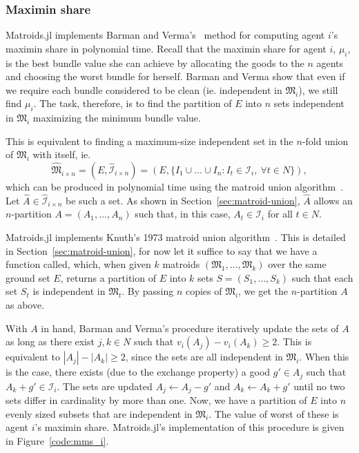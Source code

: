 \subsubsection*{Maximin share}
Matroids.jl implements Barman and Verma's~\cite[Appendix A]{barman2021existence} method for computing agent $i$'s maximin share in polynomial time. Recall that the maximin share for agent $i$,  $\mu_i$, is the best bundle value she can achieve by allocating the goods to the $n$ agents and choosing the worst bundle for herself. Barman and Verma show that even if we require each bundle considered to be clean (ie. independent in $\mathfrak{M}_i$), we still find $\mu_i$. The task, therefore, is to find the partition of $E$ into $n$ sets independent in $\mathfrak{M}_i$ maximizing the minimum bundle value.

This is equivalent to finding a maximum-size independent set in the $n$-fold union of $\mathfrak{M}_i$ with itself, ie.
$$\widehat{\mathfrak{M}}_{i \times n} = (E, \widehat{\mathcal{I}}_{i\times n}) = (E, \{ I_1\cup\dots\cup I_n : I_t \in \mathcal{I}_i,\ \forall t \in N \}),$$ 
which can be produced in polynomial time using the matroid union algorithm~\cite[Ch. 42]{schrijver-2003}. Let $\widehat{A}\in\widehat{\mathcal{I}}_{i\times n}$ be such a set. As shown in Section~\ref{sec:matroid-union}, $\widehat{A}$ allows an $n$-partition $A = (A_1,\dots,A_n)$ such that, in this case, $A_t\in\mathcal{I}_i$ for all $t\in N$.



Matroids.jl implements Knuth's 1973 matroid union algorithm~\cite{knuth1973matroidpartitioning}. This is detailed in Section~\ref{sec:matroid-union}, for now let it suffice to say that we have a function called\linebreak{}, which, when given $k$ matroids $(\mathfrak{M}_1,\dots,\mathfrak{M}_k)$ over the same ground set $E$, returns a partition of $E$ into $k$ sets $S = (S_1, \dots, S_k)$ such that each set $S_t$ is independent in $\mathfrak{M}_t$. By passing $n$ copies of $\mathfrak{M}_i$, we get the $n$-partition $A$ as above.

With $A$ in hand, Barman and Verma's procedure iteratively update the sets of $A$ as long as there exist $j, k \in N$ such that $v_i(A_j) - v_i(A_k) \geq 2$. This is equivalent to $|A_j| - |A_k| \geq 2$, since the sets are all independent in $\mathfrak{M}_i$. When this is the case, there exists (due to the exchange property) a good $g'\in A_j$ such that $A_k + g' \in \mathcal{I}_i$. The sets are updated $A_j \leftarrow A_j - g'$ and $A_k \leftarrow A_k + g'$ until no two sets differ in cardinality by more than one. Now, we have a partition of $E$ into $n$ evenly sized subsets that are independent in $\mathfrak{M}_i$. The value of worst of these is agent $i$'s maximin share. Matroids.jl's implementation of this procedure is given in Figure~\ref{code:mms_i}.




